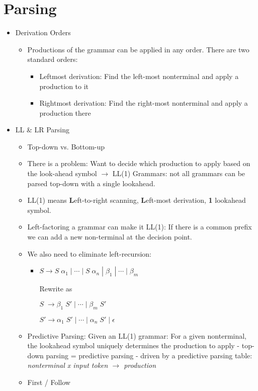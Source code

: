 \section*{Parsing}
\begin{itemize}
	\item Derivation Orders
	\begin{itemize}
		\item Productions of the grammar can be applied in any order. There are two standard orders:
		\begin{itemize}
			\item Leftmost derivation: Find the left-most nonterminal and apply a production to it
			\item Rightmost derivation: Find the right-most nonterminal and apply a production there
		\end{itemize}
	\end{itemize}
	\item LL \& LR Parsing
	\begin{itemize}

		\item Top-down vs. Bottom-up
		\item There is a problem: Want to decide which production to apply based on the look-ahead symbol $\rightarrow$ LL(1) Grammars: not all grammars can be parsed top-down with a single lookahead.
		\item LL(1) means \textbf{L}eft-to-right scanning, \textbf{L}eft-most derivation, \textbf{1} lookahead symbol.
		\item Left-factoring a grammar can make it LL(1): If there is a common prefix we can add a new non-terminal at the decision point.
		\item We also need to eliminate left-recursion: 
		\begin{itemize}
			\item $S \rightarrow S\; \alpha_1 \;|\; \cdots \;|\; S\; \alpha _n \;|\; \beta _1 \;|\; \cdots \;|\; \beta_m$
			
			Rewrite as
			
			$S\; \rightarrow \beta _1\; S' \;|\; \cdots \;|\; \beta _m\; S'$
			
			$S' \rightarrow \alpha_1\; S' \;|\;  \cdots \;|\; \alpha_n\; S' \;|\; \epsilon$ 
		\end{itemize}
		\item Predictive Parsing: Given an LL(1) grammar: For a given nonterminal, the lookahead symbol uniquely determines the production to apply - top-down parsing = predictive parsing - driven by a predictive parsing table: \textit{nonterminal x input token $\rightarrow$ production}
		\item First / Follow
		

\end{itemize}
\end{itemize}
